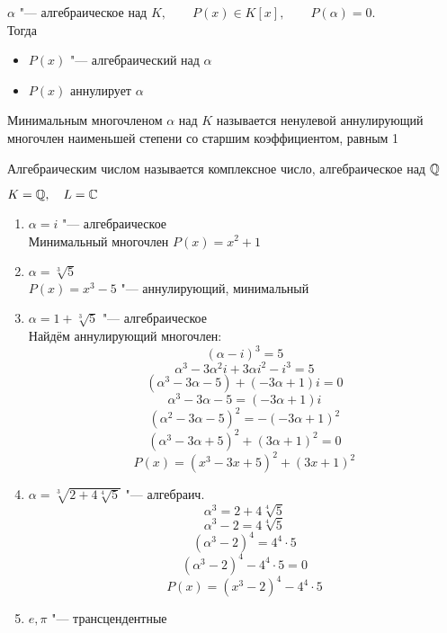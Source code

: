 \begin{definition}
	$ \alpha $ "--- алгебраическое над $ K, \qquad P(x) \in K[x], \qquad P(\alpha) = 0 $. \\
	Тогда
	\begin{itemize}
		\item $ P(x) $ "--- алгебраический над $ \alpha $
		\item $ P(x) $ аннулирует $ \alpha $
	\end{itemize}
	Минимальным многочленом $ \alpha $ над $ K $ называется ненулевой аннулирующий многочлен наименьшей степени со старшим коэффициентом, равным 1
\end{definition}

\begin{definition}
	Алгебраическим числом называется комплексное число, алгебраическое над $ \mathbb{Q} $
\end{definition}

\begin{egs}
	$ K = \mathbb{Q}, \quad L = \mathbb{C} $
	\begin{enumerate}
		\item $ \alpha = i $ "--- алгебраическое \\
		Минимальный многочлен $ P(x) = x^2 + 1 $
		\item $ \alpha = \sqrt[3]5 $ \\
		$ P(x) = x^3 - 5 $ "--- аннулирующий, минимальный
		\item $ \alpha = 1 + \sqrt[3]5 $ "--- алгебраическое \\
		Найдём аннулирующий многочлен:
		$$ (\alpha - i)^3 = 5 $$
		$$ \alpha^3 - 3\alpha^2i + 3\alpha i^2 - i^3 = 5 $$
		$$ (\alpha^3 - 3\alpha - 5) + (-3\alpha + 1)i = 0 $$
		$$ \alpha^3 - 3\alpha - 5 = (-3\alpha + 1)i $$
		$$ (\alpha^2 - 3\alpha - 5)^2 = -(-3\alpha + 1)^2 $$
		$$ (\alpha^3 - 3\alpha + 5)^2 + (3\alpha + 1)^2 = 0 $$
		$$ P(x) = (x^3 - 3x + 5)^2 + (3x + 1)^2 $$
		\item $ \alpha = \sqrt[3]{2 + 4\sqrt[4]5} $ "--- алгебраич.
		$$ \alpha^3 = 2 + 4\sqrt[4]5 $$
		$$ \alpha^3 - 2 = 4\sqrt[4]5 $$
		$$ (\alpha^3 - 2)^4 = 4^4 \cdot 5 $$
		$$ (\alpha^3 - 2)^4 - 4^4 \cdot 5 = 0 $$
		$$ P(x) = (x^3 - 2)^4 - 4^4 \cdot 5 $$
		\item $ e, \pi $ "--- трансцендентные
	\end{enumerate}
\end{egs}

